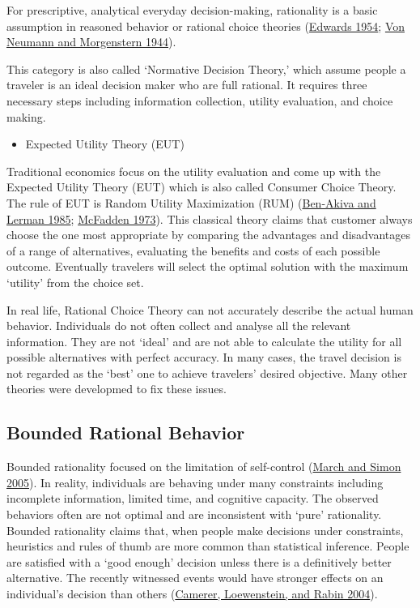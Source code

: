 \documentclass[
  11pt,
  openany]{memoir}
\providecommand{\tightlist}{%
  \setlength{\itemsep}{0pt}\setlength{\parskip}{0pt}}
\begin{document}
For prescriptive, analytical everyday decision-making, rationality is a basic assumption in reasoned behavior or rational choice theories (\protect\hyperlink{ref-edwardsTheoryDecisionMaking1954}{Edwards 1954}; \protect\hyperlink{ref-vonneumannTheoryGamesEconomic1944}{Von Neumann and Morgenstern 1944}).

This category is also called `Normative Decision Theory,' which assume people a traveler is an ideal decision maker who are full rational. It requires three necessary steps including information collection, utility evaluation, and choice making.

\begin{itemize}
\tightlist
\item
  Expected Utility Theory (EUT)
\end{itemize}

Traditional economics focus on the utility evaluation and come up with the Expected Utility Theory (EUT) which is also called Consumer Choice Theory. The rule of EUT is Random Utility Maximization (RUM) (\protect\hyperlink{ref-ben-akivaDiscreteChoiceAnalysis1985}{Ben-Akiva and Lerman 1985}; \protect\hyperlink{ref-mcfaddenConditionalLogitAnalysis1973}{McFadden 1973}). This classical theory claims that customer always choose the one most appropriate by comparing the advantages and disadvantages of a range of alternatives, evaluating the benefits and costs of each possible outcome. Eventually travelers will select the optimal solution with the maximum `utility' from the choice set.

In real life, Rational Choice Theory can not accurately describe the actual human behavior. Individuals do not often collect and analyse all the relevant information. They are not `ideal' and are not able to calculate the utility for all possible alternatives with perfect accuracy. In many cases, the travel decision is not regarded as the `best' one to achieve travelers' desired objective. Many other theories were developmed to fix these issues.

\hypertarget{bounded-rational-behavior}{%
\subsection{Bounded Rational Behavior}\label{bounded-rational-behavior}}

Bounded rationality focused on the limitation of self-control (\protect\hyperlink{ref-marchCognitiveLimitsRationality2005}{March and Simon 2005}). In reality, individuals are behaving under many constraints including incomplete information, limited time, and cognitive capacity. The observed behaviors often are not optimal and are inconsistent with `pure' rationality. Bounded rationality claims that, when people make decisions under constraints, heuristics and rules of thumb are more common than statistical inference. People are satisfied with a `good enough' decision unless there is a definitively better alternative. The recently witnessed events would have stronger effects on an individual's decision than others (\protect\hyperlink{ref-camererAdvancesBehavioralEconomics2004}{Camerer, Loewenstein, and Rabin 2004}).
\end{document}
